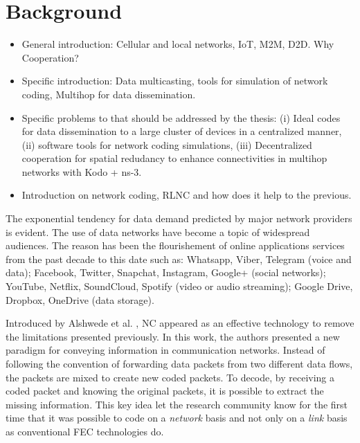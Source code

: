 \section{Background}\label{sec:background}

\begin{itemize}
\item General introduction: Cellular and local networks, \ac{IoT}, \ac{M2M}, \ac{D2D}. Why Cooperation?
\item Specific introduction: Data multicasting, tools for simulation of network coding, Multihop for data dissemination.
\item Specific problems to that should be addressed by the thesis: (i) Ideal codes for data dissemination to a large cluster of devices in a centralized manner, (ii) software tools for network coding simulations, (iii) Decentralized cooperation for spatial redudancy to enhance connectivities in multihop networks with Kodo + ns-3.
\item Introduction on network coding, RLNC and how does it help to the previous.
\end{itemize}

The exponential tendency for data demand predicted by major network providers \cite{cisco2016forecast} is evident. The use of data networks have become a topic of widespread audiences. The reason has been the flourishement of online applications services from the past decade to this date such as:  Whatsapp, Viber, Telegram (voice and data); Facebook, Twitter, Snapchat, Instagram, Google+ (social networks); YouTube, Netflix, SoundCloud, Spotify (video or audio streaming); Google Drive, Dropbox, OneDrive (data storage).

Introduced by Alshwede et al. \cite{ahlswede2000network}, \ac{NC} appeared as an effective technology to remove the limitations presented previously. In this work, the authors presented a new paradigm for conveying information in communication networks. Instead of following the convention of forwarding data packets from two different data flows, the packets are mixed to create new coded packets. To decode, by receiving a coded packet and knowing the original packets, it is possible to extract the missing information. This key idea let the research community know for the first time that it was possible to code on a \textit{network} basis and not only on a \textit{link} basis as conventional \ac{FEC} technologies do.

